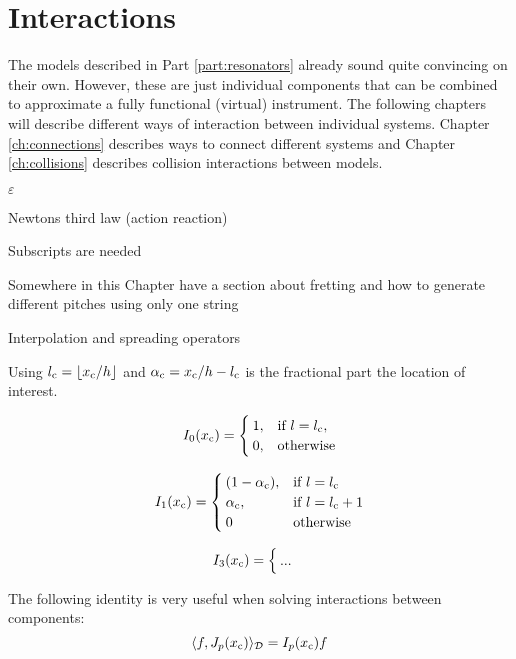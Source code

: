 \chapter*{Interactions}
The models described in Part \ref{part:resonators} already sound quite convincing on their own. However, these are just individual components that can be combined to approximate a fully functional (virtual) instrument. The following chapters will describe different ways of interaction between individual systems. Chapter \ref{ch:connections} describes ways to connect different systems and Chapter \ref{ch:collisions} describes collision interactions between models. 

$\varepsilon$

Newtons third law (action reaction)

Subscripts are needed

Somewhere in this Chapter have a section about fretting and how to generate different pitches using only one string

Interpolation and spreading operators

Using $l_\ctxt = \floor[x_\ctxt / h]$ and $\alpha_{\text{c}} = x_{\text{c}} / h - l_{\text{c}}$ is the fractional part the location of interest.
 
\begin{equation}
    I_0(x_{\text{c}}) = \begin{cases}
        1, & \text{if}\ l = l_{\text{c}},\\
        0, & \text{otherwise}
    \end{cases}
\end{equation}

\begin{equation}
    I_1(x_{\text{c}}) = \begin{cases}
        (1-\alpha_{\text{c}}), & \text{if}\ l = l_{\text{c}}\\
        \alpha_{\text{c}} , & \text{if}\ l = l_{\text{c}} + 1\\
        0 & \text{otherwise}
    \end{cases}
\end{equation}

\begin{equation}
    I_3(x_{\text{c}}) = \begin{cases}
        ...
    \end{cases}
\end{equation}

The following identity is very useful when solving interactions between components:
\begin{equation}\label{eq:identityIJ}
    \langle f, J_p(x_{\text{c}}) \rangle_{\mathcal{D}} = I_p(x_{\text{c}}) f
\end{equation}